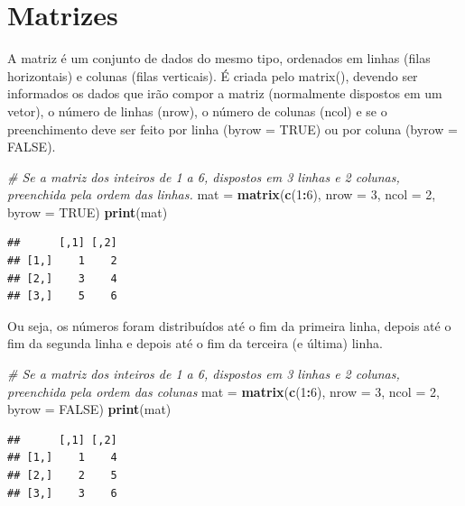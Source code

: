 \documentclass[
]{book}
\newenvironment{Shaded}{\begin{snugshade}}{\end{snugshade}}
\newcommand{\CommentTok}[1]{\textcolor[rgb]{0.56,0.35,0.01}{\textit{#1}}}
\newcommand{\DataTypeTok}[1]{\textcolor[rgb]{0.13,0.29,0.53}{#1}}
\newcommand{\DecValTok}[1]{\textcolor[rgb]{0.00,0.00,0.81}{#1}}
\newcommand{\KeywordTok}[1]{\textcolor[rgb]{0.13,0.29,0.53}{\textbf{#1}}}
\newcommand{\NormalTok}[1]{#1}
\newcommand{\OperatorTok}[1]{\textcolor[rgb]{0.81,0.36,0.00}{\textbf{#1}}}
\newcommand{\OtherTok}[1]{\textcolor[rgb]{0.56,0.35,0.01}{#1}}
\newcommand{\StringTok}[1]{\textcolor[rgb]{0.31,0.60,0.02}{#1}}
\begin{document}
\hypertarget{matrizes}{%
\section{Matrizes}\label{matrizes}}

A matriz é um conjunto de dados do mesmo tipo, ordenados em linhas (filas horizontais) e colunas (filas verticais). É criada pelo matrix(), devendo ser informados os dados que irão compor a matriz (normalmente dispostos em um vetor), o número de linhas (nrow), o número de colunas (ncol) e se o preenchimento deve ser feito por linha (byrow = TRUE) ou por coluna (byrow = FALSE).

\begin{Shaded}
\begin{Highlighting}[]
\CommentTok{# Se a matriz dos inteiros de 1 a 6, dispostos em 3 linhas e 2 colunas, preenchida pela ordem das linhas.}
\NormalTok{mat =}\StringTok{ }\KeywordTok{matrix}\NormalTok{(}\KeywordTok{c}\NormalTok{(}\DecValTok{1}\OperatorTok{:}\DecValTok{6}\NormalTok{), }\DataTypeTok{nrow =} \DecValTok{3}\NormalTok{, }\DataTypeTok{ncol =} \DecValTok{2}\NormalTok{, }\DataTypeTok{byrow =} \OtherTok{TRUE}\NormalTok{)}
\KeywordTok{print}\NormalTok{(mat)}
\end{Highlighting}
\end{Shaded}

\begin{verbatim}
##      [,1] [,2]
## [1,]    1    2
## [2,]    3    4
## [3,]    5    6
\end{verbatim}

Ou seja, os números foram distribuídos até o fim da primeira linha, depois até o fim da segunda linha e depois até o fim da terceira (e última) linha.

\begin{Shaded}
\begin{Highlighting}[]
\CommentTok{# Se a matriz dos inteiros de 1 a 6, dispostos em 3 linhas e 2 colunas, preenchida pela ordem das colunas}
\NormalTok{mat =}\StringTok{ }\KeywordTok{matrix}\NormalTok{(}\KeywordTok{c}\NormalTok{(}\DecValTok{1}\OperatorTok{:}\DecValTok{6}\NormalTok{), }\DataTypeTok{nrow =} \DecValTok{3}\NormalTok{, }\DataTypeTok{ncol =} \DecValTok{2}\NormalTok{, }\DataTypeTok{byrow =} \OtherTok{FALSE}\NormalTok{)}
\KeywordTok{print}\NormalTok{(mat)}
\end{Highlighting}
\end{Shaded}

\begin{verbatim}
##      [,1] [,2]
## [1,]    1    4
## [2,]    2    5
## [3,]    3    6
\end{verbatim}
\end{document}
